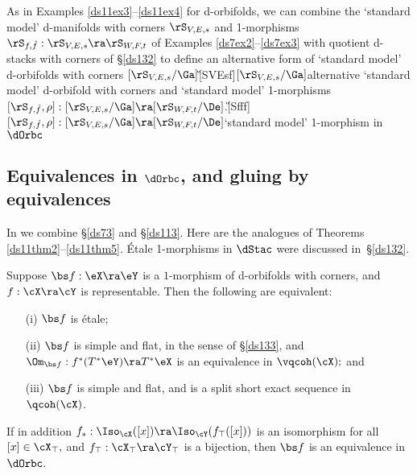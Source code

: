 \documentclass{article}
\begin{document}
As in Examples \ref{ds11ex3}--\ref{ds11ex4} for d-orbifolds, we can
combine the `standard model' d-manifolds with corners $\rS_{V,E,s}$
and 1-morphisms $\rS_{ \smash{f,\hat f}}:\rS_{V,E,s} \ra\rS_{W,F,t}$
of Examples \ref{ds7ex2}--\ref{ds7ex3} with quotient d-stacks with
corners of \S\ref{ds132}
to define an alternative form of `standard model' d-orbifolds with
corners
$[\rS_{V,E,s}/\Ga]$\G[SVEsf]{$[\rS_{V,E,s}/\Ga]$}{alternative
`standard model' d-orbifold with corners} and `standard model'
1-morphisms~$[\rS_{ \smash{f,\hat
f}},\rho]:[\rS_{V,E,s}/\Ga]\ra[\rS_{W,F,t}/\De]$.\G[Sfff]{$[\rS_{ \smash{f,\hat
f}},\rho]:[\rS_{V,E,s}/\Ga]\ra [\rS_{W,F,t}/\De]$}{`standard model'
1-morphism in $\dOrbc$}

\subsection{Equivalences in $\dOrbc$, and gluing by equivalences}
\label{ds143}

In \cite[\S 12.3]{Joyc6} we combine \S\ref{ds73} and \S\ref{ds113}.
Here are the analogues of Theorems \ref{ds11thm2}--\ref{ds11thm5}.
\'Etale 1-morphisms in $\dStac$ were discussed
in~\S\ref{ds132}.

\begin{thm} Suppose $\bs f:\eX\ra\eY$ is a $1$-morphism of
d-orbifolds with corners, and\/ $f:\cX\ra\cY$ is representable. Then
the following are equivalent:
\begin{itemize}
\setlength{\itemsep}{0pt}
\setlength{\parsep}{0pt}
\item[{\rm(i)}] $\bs f$ is \'etale;
\item[{\rm(ii)}] $\bs f$ is simple and flat, in the sense of\/ {\rm\S\ref{ds133},}
and\/ $\Om_{\bs f}:f^*(T^*\eY) \ra T^*\eX$ is an equivalence in
$\vqcoh(\cX);$ and
\item[{\rm(iii)}] $\bs f$ is simple and flat, and\/
 is a split short exact
sequence in\/~$\qcoh(\cX)$.
\end{itemize}
If in addition $f_*:\Iso_\cX([x])\ra\Iso_\cY(f_\top([x]))$ is an
isomorphism for all\/ $[x]\in\cX_\top,$ and\/
$f_\top:\cX_\top\ra\cY_\top$ is a bijection, then $\bs f$ is an
equivalence in\/~$\dOrbc$.

\label{ds14thm2}
\end{thm}
\end{document}

